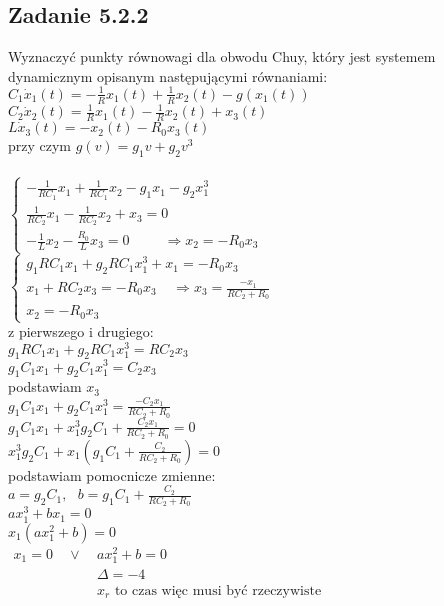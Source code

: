 \subsection*{Zadanie 5.2.2} {\color{darkgray}
	Wyznaczyć punkty równowagi dla obwodu Chuy, który jest systemem dynamicznym opisanym następującymi równaniami:\\
	$C_1\dot{x}_1(t)=-\frac 1R x_1(t)+\frac 1R x_2(t)-g(x_1(t))$\\
	$C_2\dot{x}_2(t)= \frac 1R x_1(t) -\frac 1R x_2(t)+x_3(t)$\\
	$L\dot{x}_3(t)=-x_2(t)-R_0x_3(t)$\\
	przy czym $g(v)=g_1v+g_2v^3$
}\\\\
$\begin{cases} 
-\frac{1}{RC_1}x_1+\frac{1}{RC_1}x_2-g_1x_1-g_2x_1^3\\
\frac{1}{RC_2}x_1 -\frac{1}{RC_2}x_2+x_3=0\\
-\frac 1Lx_2 -\frac{R_0}{L}x_3=0 \ \ \ \ \ \ \ \ \ \ \ \Rightarrow x_2=-R_0x_3
\end{cases}$\\
$\begin{cases} 
g_1RC_1x_1+g_2RC_1x_1^3+x_1=-R_0x_3\\
x_1+RC_2x_3=-R_0x_3\ \ \ \ \  \Rightarrow x_3=\frac{-x_1}{RC_2+R_0}\\
x_2=-R_0x_3
\end{cases}$\\
z pierwszego i drugiego:\\
$g_1RC_1x_1+g_2RC_1x_1^3=RC_2x_3$\\
$g_1C_1x_1+g_2C_1x_1^3=C_2x_3$\\
podstawiam $x_3$\\
$g_1C_1x_1+g_2C_1x_1^3=\frac{-C_2x_1}{RC_2+R_0}$\\
$g_1C_1x_1+x_1^3g_2C_1+\frac{C_2x_1}{RC_2+R_0}=0$\\
$x_1^3g_2C_1+x_1(g_1C_1+\frac{C_2}{RC_2+R_0})=0$\\
podstawiam pomocnicze zmienne:\\
$a = g_2C_1, \ \ \ b=g_1C_1+\frac{C_2}{RC_2+R_0}$\\
$ax_1^3+bx_1=0$\\
$x_1(ax_1^2+b)=0$\\
$\begin{array}{lll}   
x_1=0 & \ \ \vee \ \ & ax_1^2+b=0\\
&& \Delta = -4\\
&&x_r \text{ to czas więc musi być rzeczywiste}
 \end{array}$\\
